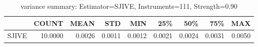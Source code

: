 \begin{table}[ht]
\centering
\caption{variance summary: Estimator=SJIVE, Instruments=111, Strength=0.90}
\begin{tabular}{lrrrrrrrr}
\toprule
 & COUNT & MEAN & STD & MIN & 25\% & 50\% & 75\% & MAX \\
\midrule
SJIVE & 10.0000 & 0.0026 & 0.0011 & 0.0012 & 0.0021 & 0.0024 & 0.0031 & 0.0050 \\
\bottomrule
\end{tabular}
\end{table}
